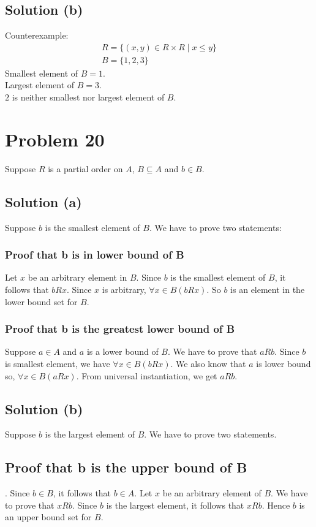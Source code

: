 \documentclass{article}
\begin{document}
\subsection{Solution (b)}
Counterexample:
\begin{align*}
  R = \{(x,y) \in R \times R \mid x \leq y\} \\
  B = \{1,2,3\}
\end{align*}
Smallest element of $B = 1$. \\
Largest element of $B = 3$. \\
$2$ is neither smallest nor largest element of $B$.

\section{Problem 20}
Suppose $R$ is a partial order on $A$, $B \subseteq A$ and $b \in B$.
\subsection{Solution (a)}
Suppose $b$ is the smallest element of $B$. We have to prove two
statements:
\subsubsection{Proof that b is in lower bound of B}
Let $x$ be an arbitrary element in $B$. Since $b$ is the smallest
element of $B$, it follows that $bRx$. Since $x$ is arbitrary,
$\forall x \in B(bRx)$. So $b$ is an element in the lower bound set
for $B$.
\subsubsection{Proof that b is the greatest lower bound of B}
Suppose $a \in A$ and $a$ is a lower bound of $B$. We have to prove
that $aRb$. Since $b$ is smallest element, we have $\forall x \in
B(bRx)$. We also know that $a$ is lower bound so, $\forall x \in
B(aRx)$. From universal instantiation, we get $aRb$.

\subsection{Solution (b)}
Suppose $b$ is the largest element of $B$. We have to prove two
statements.
\subsection{Proof that b is the upper bound of B}.
Since $b \in B$, it follows that $b \in A$. Let $x$ be an arbitrary
element of $B$. We have to prove that $xRb$. Since $b$ is the largest
element, it follows that $xRb$. Hence $b$ is an upper bound set for
$B$.
\end{document}
